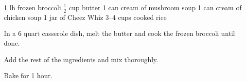 \dishtype{\vegetarian}
\begin{ingreds}
    1 lb frozen broccoli
    $\frac{1}{2}$ cup butter
    1 can cream of mushroom soup
    1 can cream of chicken soup
    1 jar of Cheez Whiz\textsuperscript{\textregistered}
    3--4 cups cooked rice
\end{ingreds}
\begin{method}
    In a 6 quart casserole dish, melt the butter and cook the frozen broccoli until done.\par
    Add the rest of the ingredients and mix thoroughly.\par
    Bake for 1 hour.
\end{method}